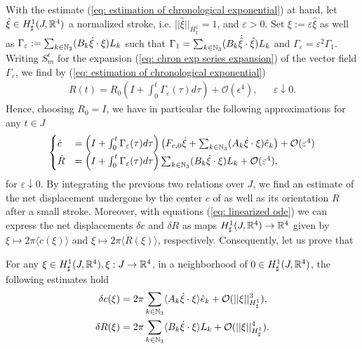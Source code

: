 With the estimate (\ref{eq: estimation of chronological exponential}) at hand, let $\hat{\xi} \in H^1_{\sharp}(J, \mathbb{R}^4)$ a normalized stroke, i.e. $||\hat{\xi}||_{H_{\sharp}^1} = 1$, and $\varepsilon > 0$. Set $\xi := \varepsilon \hat{\xi}$ as well as $\Gamma_\varepsilon := \sum_{k \in \mathbb{N}_3}(B_k \dot{\xi} \cdot \xi) L_k$ such that $\Gamma_1 = \sum_{k \in \mathbb{N}_3}(B_k \dot{\hat{\xi}} \cdot \hat{\xi}) L_k$ and  $\Gamma_\varepsilon = \varepsilon^2 \Gamma_1$. Writing $S_{m}^{\epsilon}$ for the expansion (\ref{eq: chron exp series expansion}) of the vector field $\Gamma_\varepsilon$, we find by (\ref{eq: estimation of chronological exponential})
\begin{align}
	R(t) = R_0 \left ( I + \int_{0}^{t} \Gamma_\varepsilon(\tau) d\tau \right ) + \mathcal{O}(\epsilon^4), & & \varepsilon \downarrow 0.
\end{align}
Hence, choosing $R_0 = I$, we have in particular the following approximations for any $t \in J $
\begin{align}
\label{eq: linearized ode}
\begin{cases}
\dot{c} &= \left ( I + \int_{0}^{t} \Gamma_\varepsilon(\tau) d\tau \right ) \left ( F_{c,0} \dot{\xi} + \sum_{k \in \mathbb{N}_3} (A_k \dot{\xi} \cdot \xi) \hat{e}_k \right )  + \mathcal{O}(\varepsilon^4)\\
\dot{R} &= \left ( I + \int_{0}^{t} \Gamma_\varepsilon(\tau) d\tau \right ) \sum_{k \in \mathbb{N}_3}(B_k \dot{\xi} \cdot \xi) L_k + \mathcal{O}(\varepsilon^4),
\end{cases}
\end{align}
for $\varepsilon\downarrow 0$. By integrating the previous two relations over $J$, we find an estimate of the net displacement undergone by the center $c$ of \spr as well as its orientation $R$ after a small stroke. Moreover, with equations (\ref{eq: linearized ode}) we can express the net displacements $\delta c$ and $\delta R$ as maps $H_{\sharp}^1(J,\mathbb{R}^4) \to \mathbb{R}^4$ given by $\xi \mapsto 2 \pi \langle \dot{c}(\xi) \rangle $ and $\xi \mapsto 2 \pi \langle \dot{R}(\xi) \rangle$, respectively. Consequently, let us prove that

\begin{proposition}
For any $\xi \in H_\sharp^1(J, \mathbb{R}^4), \xi: J \to \mathbb{R}^4$, in a neighborhood of $0 \in H_{\sharp}^{1}(J, \mathbb{R}^4)$, the following estimates hold
\begin{equation}
\begin{aligned}
\delta c(\xi) &= 2 \pi \sum_{k \in \mathbb{N}_3} \langle A_k \dot{\xi} \cdot \xi \rangle \hat{e}_k + \mathcal{O}(||\xi||_{H^1_{\sharp}}^3),\\
\delta R(\xi) &= 2 \pi \sum_{k \in \mathbb{N}_3} \langle B_k \dot{\xi} \cdot \xi \rangle L_k + \mathcal{O}(||\xi||^4_{H_\sharp^1}).
\end{aligned}
\end{equation}
\end{proposition}

